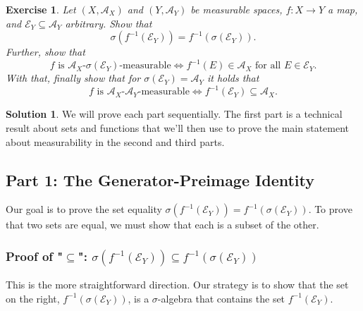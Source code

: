 \documentclass[11pt,a4paper]{article}
\theoremstyle{exercise_style}
\newtheorem*{exercise}{Exercise}
\theoremstyle{definition}
\newtheorem*{solution}{Solution}
\begin{document}
\begin{exercise}
Let $(X, \mathcal{A}_X)$ and $(Y, \mathcal{A}_Y)$ be measurable spaces, $f : X \to Y$ a map, and $\mathcal{E}_Y \subseteq \mathcal{A}_Y$ arbitrary. Show that
\begin{equation} \label{eq:1}
    \sigma(f^{-1}(\mathcal{E}_Y)) = f^{-1}(\sigma(\mathcal{E}_Y)).
\end{equation}
Further, show that
\begin{equation} \label{eq:2}
    f \text{ is } \mathcal{A}_X\text{-}\sigma(\mathcal{E}_Y)\text{-measurable} \iff f^{-1}(E) \in \mathcal{A}_X \text{ for all } E \in \mathcal{E}_Y.
\end{equation}
With that, finally show that for $\sigma(\mathcal{E}_Y) = \mathcal{A}_Y$ it holds that
\begin{equation} \label{eq:3}
    f \text{ is } \mathcal{A}_X\text{-}\mathcal{A}_Y\text{-measurable} \iff f^{-1}(\mathcal{E}_Y) \subseteq \mathcal{A}_X.
\end{equation}
\end{exercise}

\begin{solution}
We will prove each part sequentially. The first part is a technical result about sets and functions that we'll then use to prove the main statement about measurability in the second and third parts.
\end{solution}

\subsection{Part 1: The Generator-Preimage Identity}
Our goal is to prove the set equality $\sigma(f^{-1}(\mathcal{E}_Y)) = f^{-1}(\sigma(\mathcal{E}_Y))$. To prove that two sets are equal, we must show that each is a subset of the other.

\subsubsection{Proof of "$\subseteq$": $\sigma(f^{-1}(\mathcal{E}_Y)) \subseteq f^{-1}(\sigma(\mathcal{E}_Y))$}
This is the more straightforward direction. Our strategy is to show that the set on the right, $f^{-1}(\sigma(\mathcal{E}_Y))$, is a $\sigma$-algebra that contains the set $f^{-1}(\mathcal{E}_Y)$.
\end{document}
